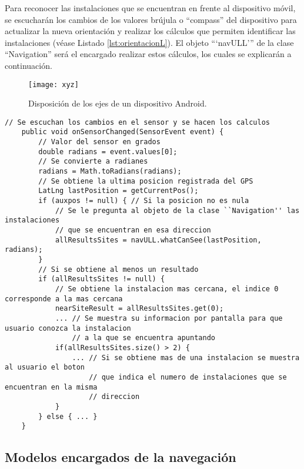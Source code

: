 Para reconocer las instalaciones que se encuentran en frente al dispositivo móvil, se escucharán los cambios de los valores brújula o ``compass'' del dispositivo para actualizar la nueva orientación y realizar los cálculos que permiten identificar las instalaciones (véase Listado \ref{lst:orientacionL}). El objeto ```navULL''' de la clase ``Navigation'' será el encargado realizar estos cálculos, los cuales se explicarán a continuación.


\begin{figure}[h]
    \centering
    \texttt{[image: xyz]}
    \caption{Disposición de los ejes de un dispositivo Android.}
    \label{fig:xyz}
\end{figure}    

\begin{minipage}{\linewidth}
\begin{lstlisting}[caption={Código que se ejecuta cada vez que se registra un cambio en el sensor que calcula la orientación.}, label={lst:orientacionL}]
    // Se escuchan los cambios en el sensor y se hacen los calculos
    public void onSensorChanged(SensorEvent event) {
        // Valor del sensor en grados
        double radians = event.values[0]; 
        // Se convierte a radianes
        radians = Math.toRadians(radians);
        // Se obtiene la ultima posicion registrada del GPS
        LatLng lastPosition = getCurrentPos();
        if (auxpos != null) { // Si la posicion no es nula
            // Se le pregunta al objeto de la clase ``Navigation'' las instalaciones 
            // que se encuentran en esa direccion
            allResultsSites = navULL.whatCanSee(lastPosition, radians);
        }
        // Si se obtiene al menos un resultado
        if (allResultsSites != null) {
            // Se obtiene la instalacion mas cercana, el indice 0 corresponde a la mas cercana
            nearSiteResult = allResultsSites.get(0);
            ... // Se muestra su informacion por pantalla para que usuario conozca la instalacion  
                // a la que se encuentra apuntando
            if(allResultsSites.size() > 2) {
                ... // Si se obtiene mas de una instalacion se muestra al usuario el boton
                    // que indica el numero de instalaciones que se encuentran en la misma
                    // direccion 
            }
        } else { ... }
    } 
\end{lstlisting}
\end{minipage}

\subsection{Modelos encargados de la navegación}

